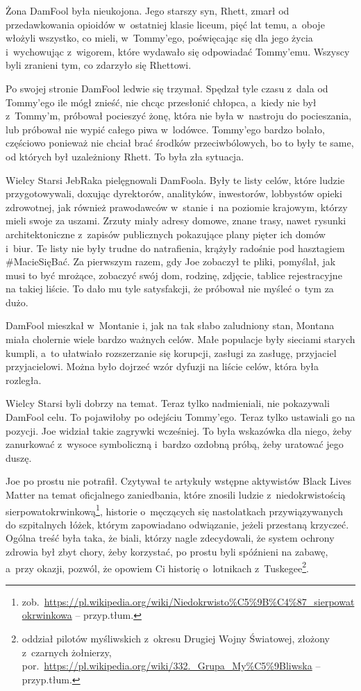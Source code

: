 \documentclass[oneside,polish,11pt,sfheadings]{mwbk}
\begin{document}
Żona DamFool była nieukojona. Jego starszy syn, Rhett, zmarł od
przedawkowania opioidów w~ostatniej klasie liceum, pięć lat temu, a~oboje włożyli wszystko, co mieli, w~Tommy'ego, poświęcając się dla jego
życia i~wychowując z~wigorem, które wydawało się odpowiadać Tommy'emu.
Wszyscy byli zranieni tym, co zdarzyło się Rhettowi.

Po swojej stronie DamFool ledwie się trzymał. Spędzał tyle czasu z~dala
od Tommy'ego ile mógł znieść, nie chcąc przesłonić chłopca, a~kiedy nie
był z~Tommy'm, próbował pocieszyć żonę, która nie była w~nastroju do
pocieszania, lub próbował nie wypić całego piwa w~lodówce. Tommy'ego
bardzo bolało, częściowo ponieważ nie chciał brać środków
przeciwbólowych, bo to były te same, od których był uzależniony Rhett.
To była zła sytuacja.

Wielcy Starsi JebRaka pielęgnowali DamFoola. Były te listy celów, które
ludzie przygotowywali, doxując dyrektorów, analityków, inwestorów,
lobbystów opieki zdrowotnej, jak również prawodawców w~stanie i~na
poziomie krajowym, którzy mieli swoje za uszami. Zrzuty miały adresy
domowe, znane trasy, nawet rysunki architektoniczne z~zapisów
publicznych pokazujące plany pięter ich domów i~biur. Te listy nie były
trudne do natrafienia, krążyły radośnie pod hasztagiem \#MacieSięBać. Za
pierwszym razem, gdy Joe zobaczył te pliki, pomyślał, jak musi to być
mrożące, zobaczyć swój dom, rodzinę, zdjęcie, tablice rejestracyjne na
takiej liście. To dało mu tyle satysfakcji, że próbował nie myśleć o~tym
za dużo.

DamFool mieszkał w~Montanie i, jak na tak słabo zaludniony stan, Montana
miała cholernie wiele bardzo ważnych celów. Małe populacje były
sieciami starych kumpli, a~to ułatwiało rozszerzanie się korupcji,
zasługi za zasługę, przyjaciel przyjacielowi. Można było dojrzeć wzór
dyfuzji na liście celów, która była rozległa.

Wielcy Starsi byli dobrzy na temat. Teraz tylko nadmieniali, nie
pokazywali DamFool celu. To pojawiłoby po odejściu Tommy'ego. Teraz
tylko ustawiali go na pozycji. Joe widział takie zagrywki wcześniej. To
była wskazówka dla niego, żeby zanurkować z~wysoce symboliczną i~bardzo
ozdobną próbą, żeby uratować jego duszę.

Joe po prostu nie potrafił. Czytywał te artykuły wstępne aktywistów
Black Lives Matter na temat oficjalnego zaniedbania, które znosili
ludzie z~niedokrwistością sierpowatokrwinkową\footnote{
	zob.~\url{https://pl.wikipedia.org/wiki/Niedokrwisto\%C5\%9B\%C4\%87\_sierpowatokrwinkowa}
-- przyp.tłum.}, historie o~męczących się nastolatkach przywiązywanych
do szpitalnych łóżek, którym zapowiadano odwiązanie, jeżeli przestaną
krzyczeć. Ogólna treść była taka, że biali, którzy nagle zdecydowali, że
system ochrony zdrowia był zbyt chory, żeby korzystać, po prostu byli
spóźnieni na zabawę, a~przy okazji, pozwól, że opowiem Ci historię o~lotnikach z~Tuskegee\footnote{ oddział pilotów myśliwskich z~okresu Drugiej
Wojny Światowej, złożony z~czarnych żołnierzy,
por.~\url{https://pl.wikipedia.org/wiki/332.\_Grupa\_My\%C5\%9Bliwska}
-- przyp.tłum.}.
\end{document}
